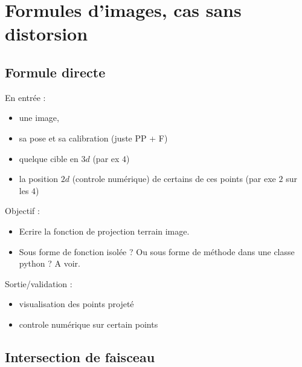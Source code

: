 
\section{Formules d'images, cas sans distorsion}


\subsection{Formule directe}

En entrée :

\begin{itemize}
   \item une image,
   \item sa pose et sa calibration (juste PP + F)
   \item quelque cible en $3d$  (par ex $4$)
   \item la position $2d$ (controle numérique) de certains de ces points (par exe $2$ sur les $4$)
\end{itemize}


Objectif :
\begin{itemize}
   \item Ecrire la fonction de projection terrain image.  
   \item Sous forme de fonction isolée ? Ou sous forme de méthode dans une classe python ? A voir.
\end{itemize}


Sortie/validation :

\begin{itemize}
   \item visualisation des points projeté
   \item controle numérique sur certain  points
\end{itemize}
   

\subsection{Intersection de faisceau}

\label{TutoBundleIntersec}

